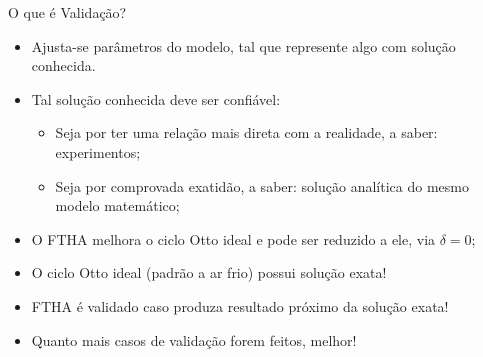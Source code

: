     \begin{frame}{O que é Validação?}\vspace*{-2em}
        \begin{itemize}
            \item<2-> Ajusta-se \alert{parâmetros} do modelo, tal que represente algo com
                \alert{solução conhecida}.
            \item<3-> Tal solução conhecida deve ser \alert{confiável}:
                \begin{itemize}
                    \item<4-> Seja por ter uma relação mais direta com a \alert{realidade}, a
                        saber: \alert{experimentos};
                    \item<5-> Seja por comprovada exatidão, a saber: \alert{solução analítica}
                        do mesmo \alert{modelo matemático};
                \end{itemize}
            \item<6-> O FTHA melhora o \alert{ciclo Otto ideal} e \alert{pode ser reduzido} a
                ele, via \alert{$\delta=0$};
            \item<7-> O ciclo Otto ideal (padrão a ar frio) possui \alert{solução exata}!
            \item<8-> FTHA é validado caso produza \alert{resultado próximo} da solução exata!
            \item<9-> Quanto \alert{mais casos} de validação forem feitos, melhor!
        \end{itemize}
    \end{frame}

